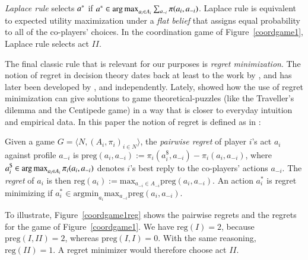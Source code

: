 \documentclass[fleqn,reqno,11pt]{article}
\begin{document}
\emph{Laplace rule} selects $a^*$ if
$a^* \in \operatorname*{arg\,max}_{a_{i} \in A_{i}} \sum_{a_{-i}} \pi(a_{i}, a_{-i})$.
Laplace rule is equivalent to expected utility maximization under a \emph{flat belief} that
assigns equal probability to all of the co-players' choices. In the coordination game of
Figure~\ref{coordgame1}, Laplace rule selects act $II$.

The final classic rule that is relevant for our purposes is \emph{regret
  minimization}. The notion of regret in decision theory dates back at least to the work by
\citet{Savage1951:The-theory-of-s}, and has later been developed by \citet{bell82}, \citet{fish82} and \citet{loosug82} independently. Lately,
\citet{HalpernPass2012:Iterated-Regret} showed how the use of regret minimization can give
solutions to game theoretical-puzzles (like the Traveller's dilemma and the Centipede game) in a way that is closer to
everyday intuition and empirical data. In this paper the notion of regret is defined as in
\citet{HalpernPass2012:Iterated-Regret}:

\begin{definition} \label{defn:regret} Given a game
  $ G=\langle N, (A_i , \pi_i)_{i \in N} \rangle $, the \emph{pairwise regret} of player $i$'s
  act $a_i$ against profile $a_{-i}$ is
  $\text{preg}(a_i,a_{-i}):= \pi_i(a_i^\$,a_{-i})-\pi_i(a_i,a_{-i}) $, where
  $a_i^\$ \in \operatorname*{arg\,max}_{a_i \in A_i} \pi_i(a_i, a_{-i})$ denotes $i$'s best reply to the
  co-players' actions $a_{-i}$. The \emph{regret} of $a_i$ is then
  $\text{reg}(a_i):= \text{max}_{a_{-i}\in A_{-i}} \text{preg}(a_i,a_{-i}) $. An
  action $a^{*}_i $ is regret minimizing if
  $a^{*}_i \in \text{argmin}_{a_i} \text{max}_{a_{-i}} \text{preg}(a_i,a_{-i})$.
\end{definition}

\noindent To illustrate, Figure~\ref{coordgame1reg} shows the pairwise regrets and the regrets for the game of Figure~\ref{coordgame1}. 
We have
$\text{reg}(I)=2$, because $\text{preg}(I,II)=2$, whereas $ \text{preg}(I,I)=0 $. With the same reasoning, $\text{reg}(II)=1$. A regret minimizer would therefore choose act $II$.
\end{document}
